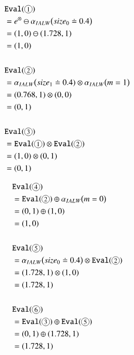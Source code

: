 \begin{example}
\begin{minipage}{0.49\linewidth}
    \begin{align*}
        &\mathtt{Eval}(\footcircled{$1$})\\
        &=
        e^\otimes \ominus \alpha_{IALW}\big(size_0\doteq 0.4\big) \\
        &=
        (1,0) \ominus (1.728,1) \\
        &= (1,0)
        \\
        \hfill
        \\
        &\mathtt{Eval}(\footcircled{$2$})\\
        &=
        \alpha_{IALW}\big( size_1\doteq 0.4) \otimes \alpha_{IALW}\big(  m=1 \big) \\
        &=
        (0.768,1) \otimes (0,0) \\
        &=
        (0,1)\\
        \hfill
        \\
        &\mathtt{Eval}(\footcircled{$3$})\\
        &=
        \mathtt{Eval}(\footcircled{$1$}) \otimes \mathtt{Eval}(\footcircled{$2$}) \\
        &=
        (1,0) \otimes (0,1) \\
        &=
        (0,1)\\
    \end{align*}
\end{minipage}
\vline
\begin{minipage}{0.49\linewidth}
    \begin{align*}
        &\mathtt{Eval}(\footcircled{$4$})\\
        &=
        \mathtt{Eval}(\footcircled{$2$}) \oplus \alpha_{IALW}\big(  m=0 \big) \\
        &=
        (0,1) \oplus (1,0) \\
        &=
        (1,0)\\
        \hfill
        \\
        &\mathtt{Eval}(\footcircled{$5$})\\
        &=
        \alpha_{IALW}\big(  size_0\doteq 0.4 \big) \otimes \mathtt{Eval}(\footcircled{$2$})  \\
        &=
        (1.728,1) \otimes (1,0) \\
        &=
        (1.728,1)\\
        \hfill
        \\
        &\mathtt{Eval}(\footcircled{$6$})\\
        &=
        \mathtt{Eval}(\footcircled{$3$}) \oplus \mathtt{Eval}(\footcircled{$5$})  \\
        &=
        (0,1) \oplus (1.728,1) \\
        &=
        (1.728,1)\\
    \end{align*}
\end{minipage}



\end{example}
